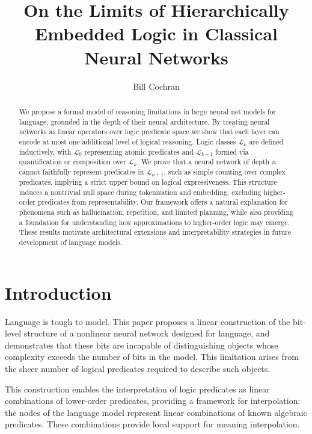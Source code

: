 \documentclass[12pt]{article}
\theoremstyle{plain}
\begin{document}
\title{On the Limits of Hierarchically Embedded Logic in Classical Neural Networks}
\author{Bill Cochran}
\maketitle

\begin{abstract}
We propose a formal model of reasoning limitations in large neural net models for language,
grounded in the depth of their neural architecture.
By treating neural networks as linear operators over logic predicate space we 
show that each layer can encode at most 
one additional level of logical reasoning. Logic classes $\mathcal{L}_k$ are 
defined inductively, with $\mathcal{L}_0$ representing atomic predicates and 
$\mathcal{L}_{k+1}$ formed via quantification or composition over $\mathcal{L}_k$. 
We prove that a neural network of depth $n$ cannot faithfully represent 
predicates in $\mathcal{L}_{n+1}$, such as simple counting over complex 
predicates, implying a strict upper bound on logical expressiveness. This structure 
induces a nontrivial null space during tokenization and embedding, excluding 
higher-order predicates from representability. Our framework offers a natural 
explanation for phenomena such as hallucination, repetition, and limited planning,
while also providing a foundation for understanding how 
approximations to higher-order logic may emerge. These results motivate architectural 
extensions and interpretability strategies in future development of language
models.
\end{abstract}


\section{Introduction}
Language is tough to model. This paper proposes a linear construction
of the bit-level structure of a nonlinear neural network designed for language,
and demonstrates that these bits are incapable of distinguishing objects
whose complexity exceeds the number of bits in the model. This limitation
arises from the sheer number of logical predicates required
to describe such objects.

This construction enables the interpretation of logic predicates
as linear combinations of lower-order predicates, providing
a framework for interpolation: the nodes of the language model
represent linear combinations of known algebraic predicates. These
combinations provide local support for meaning interpolation.
\end{document}
